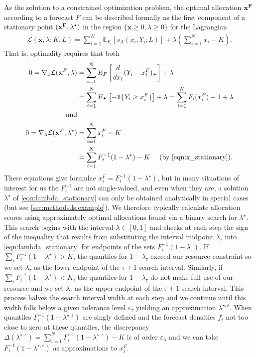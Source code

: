 \documentclass{article}
\begin{document}
As the solution to a constrained optimization problem, the optimal allocation $\bf{x}^F$ according to a forecast $F$ can be described formally as the first component of a stationary point $(\bf{x}^F, \lambda^{\star})$ in the region $\{\mathbf{x} \geq 0, \lambda \geq 0\}$ for the Lagrangian 
\begin{align}
\mathcal{L}(\mathbf{x},\lambda; K, L) = \sum_{i=1}^{N} \mathbb{E}_{F_i}[s_A(x_i, Y_i; L)] + \lambda\left(\sum_{i=1}^{N} x_i - K\right).
\end{align}
That is, optimality requires that both
\begin{align}
0 = \nabla_{x} \mathcal{L}(\mathbf{x}^F, \lambda) &= \sum_{i=1}^{N} E_F \left[\frac{d}{dx_i}(Y_i - x_i^F)_{+}\right] + \lambda \\
& = \sum_{i=1}^{N} E_F \left[-\mathbf{1}\{Y_i \geq x_i^F\}\right] + \lambda  = \sum_{i=1}^{N} F_i(x_i^F)-1 + \lambda  \label{eqn:x_stationary}\\
\text{ and} \\
0 = \nabla_{\lambda} \mathcal{L}(\mathbf{x}^F, \lambda^{\star}) &= \sum_{i=1}^{N} x_i^F - K\\
& = \sum_{i=1}^{N} F_{i}^{-1}(1-\lambda^{\star}) - K \quad \text{ (by \eqref{eqn:x_stationary})}. \label{eqn:lambda_stationary}
\end{align}
These equations give formulae $x_i^F = F_i^{-1}(1-\lambda^{\star})$, but in many situations of interest for us the $F_i^{-1}$ are not single-valued, and even 
when they are, a solution $\lambda^{\star}$ of \eqref{eqn:lambda_stationary} can only be obtained analytically in special cases (but see \ref{sec:methods.ls.example}). We therefore typically calculate allocation scores using approximately optimal allocations found via a binary search for $\lambda^{\star}$.  This search begins with the interval $\lambda \in [0,1]$ and 
checks at each step the sign of the inequality that results from substituting the interval midpoint $\lambda_{\tau}$ into \eqref{eqn:lambda_stationary} for endpoints of the sets $F_i^{-1}(1-\lambda_{\tau})$.  If $\sum_{i} F_{i}^{-1}(1-\lambda^{\star}) > K$, the quantiles for $1-\lambda_{\tau}$ exceed our resource constraint so we set $\lambda_{\tau}$ as the lower endpoint of the $\tau + 1$ search interval.  Similarly, if $\sum_{i} F_{i}^{-1}(1-\lambda^{\star}) < K$, the quantiles for 
$1-\lambda_{\tau}$ do not make full use of our resource and we set $\lambda_{\tau}$ as the upper endpoint of the $\tau + 1$ search interval.  This process halves the search interval width at each step and we continue until this width falls below a given tolerance level $\varepsilon_{\tau}$ yielding an 
approximation $\lambda^{\star, \varepsilon}$. When quantiles $F_i^{-1}(1-\lambda^{\star, \varepsilon})$ are singly defined and the forecast densities $f_i$
not too close to zero at these quantiles, the discrepancy $\Delta(\lambda^{\star, \varepsilon})  = \sum_{i=1}^{N} F_{i}^{-1}(1-\lambda^{\star, \varepsilon}) - K$ is of order $\varepsilon_{\lambda}$ and we can take $F_{i}^{-1}(1-\lambda^{\star, \varepsilon})$ as approximations to $x_i^F$.
\end{document}
